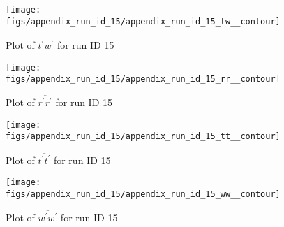 \begin{figure}[H]
\centering
\texttt{[image: figs/appendix\_run\_id\_15/appendix\_run\_id\_15\_tw\_\_contour]}
\caption{Plot of $\overline{t^\prime w^\prime}$ for run ID 15}
\label{fig:appendix_run_id_15_tw__contour}
\end{figure}


\begin{figure}[H]
\centering
\texttt{[image: figs/appendix\_run\_id\_15/appendix\_run\_id\_15\_rr\_\_contour]}
\caption{Plot of $\overline{r^\prime r^\prime}$ for run ID 15}
\label{fig:appendix_run_id_15_rr__contour}
\end{figure}


\begin{figure}[H]
\centering
\texttt{[image: figs/appendix\_run\_id\_15/appendix\_run\_id\_15\_tt\_\_contour]}
\caption{Plot of $\overline{t^\prime t^\prime}$ for run ID 15}
\label{fig:appendix_run_id_15_tt__contour}
\end{figure}


\begin{figure}[H]
\centering
\texttt{[image: figs/appendix\_run\_id\_15/appendix\_run\_id\_15\_ww\_\_contour]}
\caption{Plot of $\overline{w^\prime w^\prime}$ for run ID 15}
\label{fig:appendix_run_id_15_ww__contour}
\end{figure}


